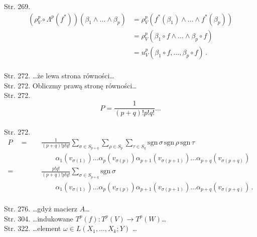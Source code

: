 \documentclass[a4paper,11pt]{article}
\numberwithin{equation}{section}
\begin{document}
Str. 269. \begin{displaymath}
  \begin{split}
    (\rho_{ V }^{ p } \circ \Lambda^{ p }( f^{ * } ) ) ( \beta_{ 1 } \wedge \ldots \wedge \beta_{ p } ) &= \rho_{ V }^{ p } ( f^{ * }( \beta_{ 1 } ) \wedge \ldots \wedge f^{ * } ( \beta_{ p } ) ) \\
                                                                    &= \rho_{ V }^{ p } (\beta_{ 1 } \circ f \wedge \ldots \wedge \beta_{ p } \circ f )\\
                                                                    &= u_{ V }^{ p } ( \beta_{ 1 } \circ f, \ldots, \beta_{ p } \circ f ) \, .
  \end{split}
\end{displaymath} \\
Str. 272. \ldots że lewa strona równości\ldots \\
Str. 272. Obliczmy prawą stronę równości\ldots \\
Str. 272. $$P = \frac{ 1 }{ ( p + q )! p! q! } \ldots$$ \\
Str. 272. \begin{displaymath}
  \begin{split}
    P \quad =& \quad \frac{ 1 }{ ( p + q )! p! q! } \sum_{ \sigma \in S_{ p + q } } \sum_{ \rho \in  S_{ p } } \sum_{ \tau \in S_{ q } } \textrm{sgn} \, \sigma \, \textrm{sgn} \, \rho \, \textrm{sgn} \, \tau \\
         & \quad \qquad \alpha_{ 1 } ( v_{ \sigma( 1 ) } ) \ldots \alpha_{ p } ( v_{ \sigma ( p ) } ) \alpha_{ p + 1 } ( v_{ \sigma( p + 1 ) } ) \ldots \alpha_{ p + q } ( v_{ \sigma ( p + q ) } ) \\
    = & \quad \frac{ p! q! }{ ( p + q )! p! q! } \sum_{ \sigma \in S_{ p + q } } \textrm{sgn} \, \sigma \\
         & \quad \qquad \alpha_{ 1 } ( v_{ \sigma( 1 ) } ) \ldots \alpha_{ p } ( v_{ \sigma ( p ) } ) \alpha_{ p
           + 1 } ( v_{ \sigma( p + 1 ) } ) \ldots \alpha_{ p + q } ( v_{ \sigma ( p + q ) } )
           \, .
  \end{split}
\end{displaymath} \\
Str. 276. \ldots gdyż macierz $A$\ldots \\
Str. 304. \ldots indukowane
$T^{ p } ( f ) : T^{ p } ( V ) \rightarrow T^{ p } (W)$\ldots \\
Str. 322. \ldots element $\omega \in L( X_{ 1 } ,\ldots, X_{ k }; Y )$ \ldots \\
\end{document}
